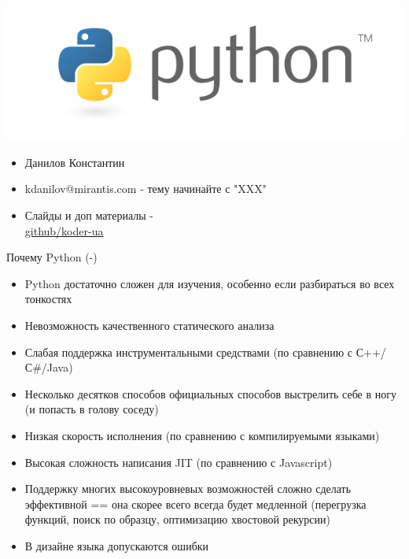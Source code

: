 \documentclass{article}
\begin{document}
\LARGE

\begin{center} \includegraphics[]{images/python-logo-master-v3-TM-flattened.png} \end{center}
\begin{itemize}
    \item Данилов Константин
    \item kdanilov@mirantis.com - тему начинайте с "XXX"
    \item Слайды и доп материалы - \\
            \href{https://github.com/koder-ua/python-classes/tree/master/slides/pdf}{github/koder-ua}
\end{itemize}
\newpage
\begin{center} Почему Python (-) \end{center}
\begin{itemize}
    \item Python достаточно сложен для изучения, особенно если разбираться во всех тонкостях
    \item Невозможность качественного статического анализа
    \item Слабая поддержка инструментальными средствами (по сравнению с С++/С\#/Java)
    \item Несколько десятков способов официальных способов выстрелить себе в ногу (и попасть в голову соседу)
    \item Низкая скорость исполнения (по сравнению с компилируемыми языками)
    \item Высокая сложность написания JIT (по сравнению с Javascript)
    \item Поддержку многих высокоуровневых возможностей сложно сделать эффективной 
          == она скорее всего всегда будет медленной
            (перегрузка функций, поиск по образцу, оптимизацию хвостовой рекурсии)
    \item В дизайне языка допускаются ошибки
\end{itemize}
\newpage
\end{document}

